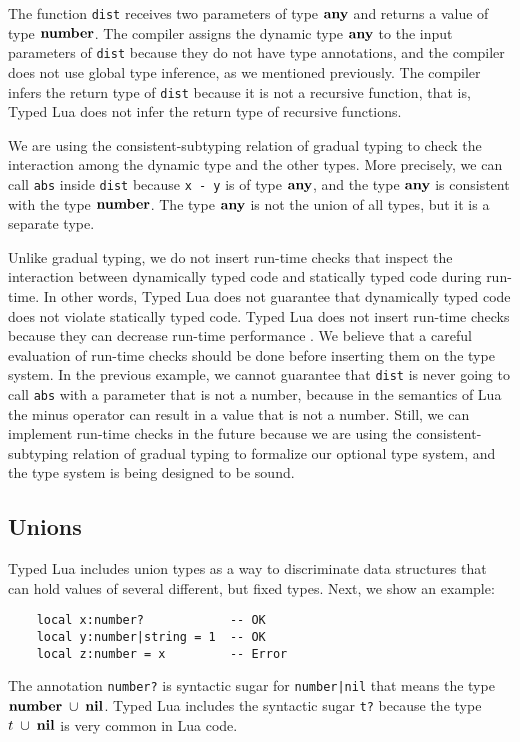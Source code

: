 The function \texttt{dist} receives two parameters of type $\mathbf{any}$
and returns a value of type $\mathbf{number}$.
The compiler assigns the dynamic type $\mathbf{any}$ to the input
parameters of \texttt{dist} because they do not have type annotations,
and the compiler does not use global type inference, as we mentioned
previously.
The compiler infers the return type of \texttt{dist} because it is
not a recursive function, that is, Typed Lua does not infer the return
type of recursive functions.

We are using the consistent-subtyping relation of gradual
typing to check the interaction among the dynamic type and the other
types.
More precisely, we can call \texttt{abs} inside \texttt{dist} because
\texttt{x - y} is of type $\mathbf{any}$, and the type $\mathbf{any}$ is
consistent with the type $\mathbf{number}$.
The type $\mathbf{any}$ is not the union of all types, but it is a separate
type.

Unlike gradual typing, we do not insert run-time checks that
inspect the interaction between dynamically typed code and statically
typed code during run-time.
In other words, Typed Lua does not guarantee that dynamically typed
code does not violate statically typed code.
Typed Lua does not insert run-time checks because they can decrease
run-time performance \citep{allende2013cis}.
We believe that a careful evaluation of run-time checks should be done
before inserting them on the type system.
In the previous example, we cannot guarantee that \texttt{dist} is never
going to call \texttt{abs} with a parameter that is not a number,
because in the semantics of Lua the minus operator can result in a
value that is not a number.
Still, we can implement run-time checks in the future because we are
using the consistent-subtyping relation of gradual typing to
formalize our optional type system, and the type system is being
designed to be sound.

\subsection{Unions}

Typed Lua includes union types as a way to discriminate data
structures that can hold values of several different, but fixed types.
Next, we show an example:
\begin{verbatim}
    local x:number?            -- OK
    local y:number|string = 1  -- OK
    local z:number = x         -- Error
\end{verbatim}

The annotation \texttt{number?} is syntactic sugar for
\texttt{number|nil} that means the type $\mathbf{number}\;\cup\;\mathbf{nil}$.
Typed Lua includes the syntactic sugar \texttt{t?} because the
type $t\;\cup\;\mathbf{nil}$ is very common in Lua code.

